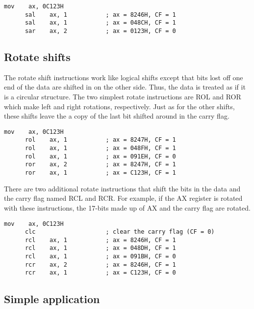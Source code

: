 \begin{lstlisting}[language={[x86masm]Assembler}]
      mov    ax, 0C123H
      sal    ax, 1           ; ax = 8246H, CF = 1
      sal    ax, 1           ; ax = 048CH, CF = 1
      sar    ax, 2           ; ax = 0123H, CF = 0
\end{lstlisting}

\subsection{Rotate shifts}

The rotate shift instructions work like logical shifts except that
bits lost off one end of the data are shifted in on the other
side. Thus, the data is treated as if it is a circular structure. The
two simplest rotate instructions are {\code ROL}  and
{\code ROR}  which make left and right rotations,
respectively. Just as for the other shifts, these shifts leave the a
copy of the last bit shifted around in the carry flag.
\begin{lstlisting}[language={[x86masm]Assembler}]
      mov    ax, 0C123H
      rol    ax, 1           ; ax = 8247H, CF = 1
      rol    ax, 1           ; ax = 048FH, CF = 1
      rol    ax, 1           ; ax = 091EH, CF = 0
      ror    ax, 2           ; ax = 8247H, CF = 1
      ror    ax, 1           ; ax = C123H, CF = 1
\end{lstlisting}

There are two additional rotate instructions that shift the bits in
the data and the carry flag named {\code RCL}  and {\code
RCR}.  For example, if the {\code AX} register is rotated
with these instructions, the 17-bits made up of {\code AX} and the
carry flag are rotated.
\begin{lstlisting}[language={[x86masm]Assembler}]
      mov    ax, 0C123H
      clc                    ; clear the carry flag (CF = 0)
      rcl    ax, 1           ; ax = 8246H, CF = 1
      rcl    ax, 1           ; ax = 048DH, CF = 1
      rcl    ax, 1           ; ax = 091BH, CF = 0
      rcr    ax, 2           ; ax = 8246H, CF = 1
      rcr    ax, 1           ; ax = C123H, CF = 0
\end{lstlisting}

\subsection{Simple application\label{sect:AddBitsExample}}

